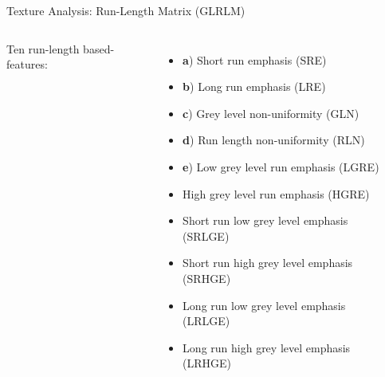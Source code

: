 \documentclass[10pt,aspectratio=169]{beamer}
\begin{document}
\begin{frame}{Texture Analysis: Run-Length Matrix (GLRLM)}
  \begin{columns}[onlytextwidth]
    Ten run-length based-features:
    \begin{itemize}
       \item \textbf{a}) Short run emphasis (SRE) 
       \item \textbf{b}) Long run emphasis (LRE) 
       \item \textbf{c}) Grey level non-uniformity (GLN) 
       \item \textbf{d}) Run length non-uniformity (RLN) 
       \item \textbf{e}) Low grey level run emphasis (LGRE)
       \item High grey level run emphasis (HGRE)
       \item Short run low grey level emphasis (SRLGE)
       \item Short run high grey level emphasis (SRHGE)
       \item Long run low grey level emphasis (LRLGE)
       \item Long run high grey level emphasis (LRHGE)
    \end{itemize}
    \begin{columns}
      \centering
      \centering
      \\
      \vspace{0.3mm}
      \\
      \vspace{0.3mm}
      \centering
      \\
      \vspace{0.3mm}
      \\
      \vspace{0.3mm}
    \end{columns}
  \end{columns}
\end{frame}
\end{document}
